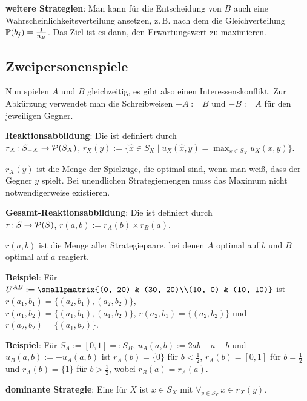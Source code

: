 \textbf{weitere Strategien}:
Man kann für die Entscheidung von $B$ auch eine Wahrscheinlichkeitsverteilung ansetzen,
z.\,B. nach dem  die Gleichverteilung
$\PP(b_j) = \frac{1}{n_B}$.
Das Ziel ist es dann, den Erwartungswert zu maximieren.

\subsection{%
    Zweipersonenspiele%
}

Nun spielen $A$ und $B$ gleichzeitig, es gibt also einen Interessenskonflikt.
Zur Abkürzung verwendet man die Schreibweisen $-A := B$ und $-B := A$ für den jeweiligen Gegner.

\textbf{Reaktionsabbildung}:
Die  ist definiert durch\\
$r_X\colon S_{-X} \to \P(S_X)$,
$r_X(y) := \{\widehat{x} \in S_X \;|\; u_X(\widehat{x}, y) = \max_{x \in S_X} u_X(x, y)\}$.

$r_X(y)$ ist die Menge der Spielzüge, die optimal sind, wenn man weiß, dass der Gegner $y$ spielt.
Bei unendlichen Strategiemengen muss das Maximum nicht notwendigerweise existieren.

\textbf{Gesamt-Reaktionsabbildung}:
Die  ist definiert durch\\
$r\colon S \to \P(S)$,
$r(a, b) := r_A(b) \times r_B(a)$.

$r(a, b)$ ist die Menge aller Strategiepaare, bei denen $A$ optimal auf $b$ und $B$ optimal auf
$a$ reagiert.

\linie

\textbf{Beispiel}:
Für $U^{AB} := \smallpmatrix{(0, 20) & (30, 20)\\(10, 0) & (10, 10)}$ ist
$r(a_1, b_1) = \{(a_2, b_1), (a_2, b_2)\}$,\\
$r(a_1, b_2) = \{(a_1, b_1), (a_1, b_2)\}$,
$r(a_2, b_1) = \{(a_2, b_2)\}$ und
$r(a_2, b_2) = \{(a_1, b_2)\}$.

\textbf{Beispiel}:
Für $S_A := [0, 1] =: S_B$, $u_A(a, b) := 2ab - a - b$ und $u_B(a, b) := -u_A(a, b)$ ist
$r_A(b) = \{0\}$ für $b < \frac{1}{2}$,
$r_A(b) = [0, 1]$ für $b = \frac{1}{2}$ und
$r_A(b) = \{1\}$ für $b > \frac{1}{2}$,
wobei $r_B(a) = r_A(a)$.

\linie

\textbf{dominante Strategie}:
Eine  für $X$
ist $x \in S_X$ mit $\forall_{y \in S_Y}\; x \in r_X(y)$.

